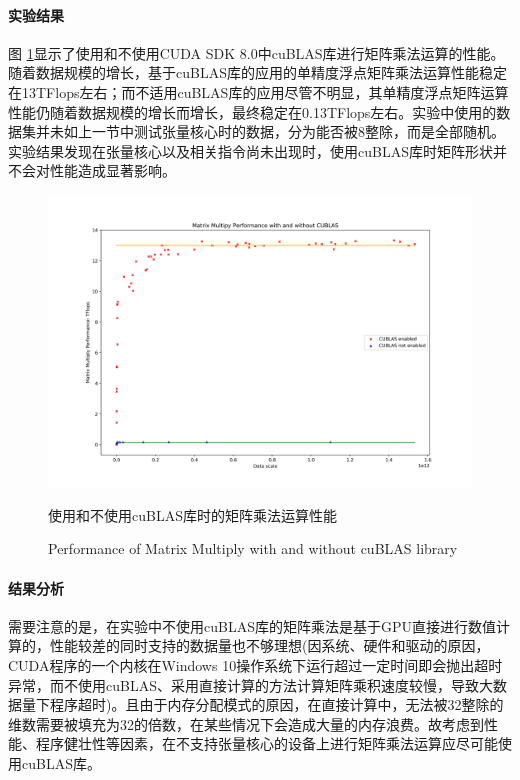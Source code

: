 \paragraph{实验结果}
\par 图 \ref{Fig.CUBLASPerf}显示了使用和不使用CUDA SDK 8.0中cuBLAS库进行矩阵乘法运算的性能。随着数据规模的增长，基于cuBLAS库的应用的单精度浮点矩阵乘法运算性能稳定在13TFlops左右；而不适用cuBLAS库的应用尽管不明显，其单精度浮点矩阵运算性能仍随着数据规模的增长而增长，最终稳定在0.13TFlops左右。实验中使用的数据集并未如上一节中测试张量核心时的数据，分为能否被8整除，而是全部随机。实验结果发现在张量核心以及相关指令尚未出现时，使用cuBLAS库时矩阵形状并不会对性能造成显著影响。
\begin{figure}
	\centering
	\includegraphics[width=15cm]{figures/CUBLASPerf.jpg}
	\renewcommand{\thefigure}{\arabic{section}-\arabic{figure} }
	\renewcommand{\figurename}{图}
	\caption{使用和不使用cuBLAS库时的矩阵乘法运算性能}
	\addtocounter{figure}{-1}
	\renewcommand{\thefigure}{\arabic{section}-\arabic{figure} }
	\renewcommand{\figurename}{Figure}
	\caption{Performance of Matrix Multiply with and without cuBLAS library}
	\label{Fig.CUBLASPerf}
\end{figure}
\paragraph{结果分析}
\par 需要注意的是，在实验中不使用cuBLAS库的矩阵乘法是基于GPU直接进行数值计算的，性能较差的同时支持的数据量也不够理想(因系统、硬件和驱动的原因，CUDA程序的一个内核在Windows 10操作系统下运行超过一定时间即会抛出超时异常，而不使用cuBLAS、采用直接计算的方法计算矩阵乘积速度较慢，导致大数据量下程序超时)。且由于内存分配模式的原因，在直接计算中，无法被32整除的维数需要被填充为32的倍数，在某些情况下会造成大量的内存浪费。故考虑到性能、程序健壮性等因素，在不支持张量核心的设备上进行矩阵乘法运算应尽可能使用cuBLAS库。

